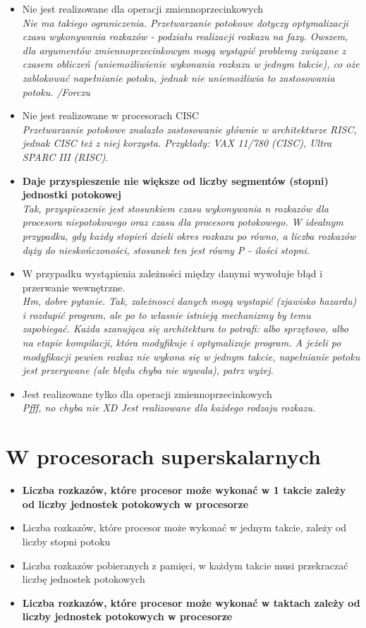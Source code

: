 \documentclass[a4paper,twoside]{article}
\begin{document}
	\begin{itemize}
    \item Nie jest realizowane dla operacji zmiennoprzecinkowych\\
    {\small \emph{Nie ma takiego ograniczenia. Przetwarzanie potokowe dotyczy optymalizacji czasu wykonywania rozkazów - podziału realizacji rozkazu na fazy. Owszem, dla argumentów zmiennoprzecinkowym mogą wystąpić problemy związane z czasem obliczeń (uniemożliwienie wykonania rozkazu w jednym takcie), co oże zablokować napełnianie potoku, jednak nie uniemożliwia to zastosowania potoku. /Forczu}}
    \item Nie jest realizowane w procesorach CISC\\
    {\small \emph{Przetwarzanie potokowe znalazło zastosowanie głównie w architekturze RISC, jednak CISC też z niej korzysta. Przykłady: VAX 11/780 (CISC), Ultra SPARC III (RISC)}.}
    \item \textbf{Daje przyspieszenie nie większe od liczby segmentów (stopni) jednostki potokowej}\\
    {\small \emph{Tak, przyspieszenie jest stosunkiem czasu wykonywania \emph{n} rozkazów dla procesora niepotokowego oraz czasu dla procesora potokowego. W idealnym przypadku, gdy każdy stopień dzieli okres rozkazu po równo, a liczba rozkazów dąży do nieskończoności, stosunek ten jest równy P - ilości stopni.}}
    \item W przypadku wystąpienia zależności między danymi wywołuje błąd i przerwanie wewnętrzne.\\
    {\small \emph{Hm, dobre pytanie. Tak, zależnosci danych mogą wystapić (zjawisko hazardu) i rozdupić program, ale po to własnie istnieją mechanizmy by temu zapobiegać. Każda szanująca się architektura to potrafi: albo sprzętowo, albo na etapie kompilacji, która modyfikuje i optymalizuje program. A jeżeli po modyfikacji pewien rozkaz nie wykona się w jednym takcie, napełnianie potoku jest przerywane (ale błędu chyba nie wywala), patrz wyżej.}}
    \item Jest realizowane tylko dla operacji zmiennoprzecinkowych\\
    {\small \emph{Pfff, no chyba nie XD Jest realizowane dla każdego rodzaju rozkazu.}}
    \end{itemize}

\section{W procesorach superskalarnych}
	\begin{itemize}
    \item \textbf{Liczba rozkazów, które procesor może wykonać w 1 takcie zależy od liczby jednostek potokowych w procesorze}
    \item Liczba rozkazów, które procesor może wykonać w jednym takcie, zależy od liczby stopni potoku
    \item Liczba rozkazów pobieranych z pamięci, w każdym takcie musi przekraczać liczbę jednostek potokowych
    \item \textbf{Liczba rozkazów, które procesor może wykonać w taktach zależy od liczby jednostek potokowych w procesorze}
    \end{itemize}
\end{document}

